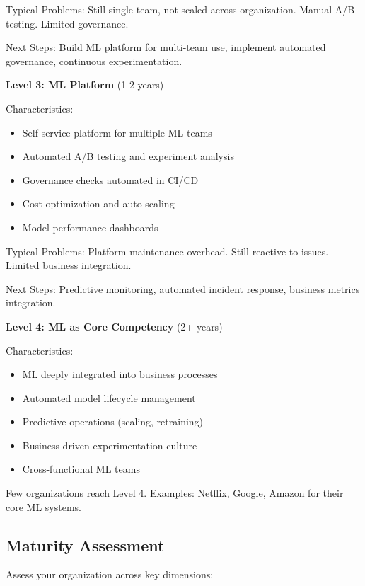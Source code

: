 Typical Problems: Still single team, not scaled across organization. Manual A/B testing. Limited governance.

Next Steps: Build ML platform for multi-team use, implement automated governance, continuous experimentation.

\textbf{Level 3: ML Platform} (1-2 years)

Characteristics:
\begin{itemize}
    \item Self-service platform for multiple ML teams
    \item Automated A/B testing and experiment analysis
    \item Governance checks automated in CI/CD
    \item Cost optimization and auto-scaling
    \item Model performance dashboards
\end{itemize}

Typical Problems: Platform maintenance overhead. Still reactive to issues. Limited business integration.

Next Steps: Predictive monitoring, automated incident response, business metrics integration.

\textbf{Level 4: ML as Core Competency} (2+ years)

Characteristics:
\begin{itemize}
    \item ML deeply integrated into business processes
    \item Automated model lifecycle management
    \item Predictive operations (scaling, retraining)
    \item Business-driven experimentation culture
    \item Cross-functional ML teams
\end{itemize}

Few organizations reach Level 4. Examples: Netflix, Google, Amazon for their core ML systems.

\subsection{Maturity Assessment}

Assess your organization across key dimensions:


